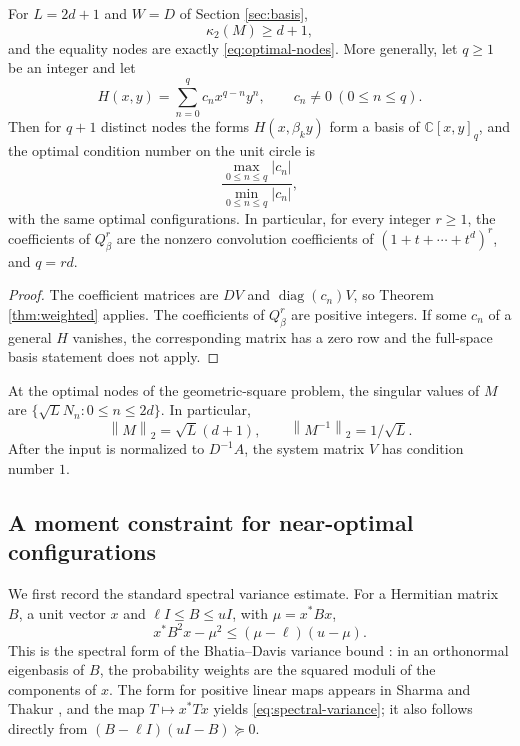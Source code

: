 \documentclass[10pt,twoside,final]{siamart1116}
\numberwithin{equation}{section}
\numberwithin{theorem}{section}
\newcommand{\C}{\mathbb C}
\newcommand{\diag}{\operatorname{diag}}
\newcommand{\norm}[1]{\left\lVert#1\right\rVert_2}
\newcommand{\cond}{\kappa_2}
\begin{document}
\begin{corollary}\label{thm:optimal}
For $L=2d+1$ and $W=D$ of Section \ref{sec:basis},
\begin{equation}\label{eq:opt}
\cond(M)\ge d+1,
\end{equation}
and the equality nodes are exactly \eqref{eq:optimal-nodes}. More generally, let $q\ge1$
be an integer and let
\[
H(x,y)=\sum_{n=0}^{q}c_nx^{q-n}y^n,\qquad c_n\ne0\ (0\le n\le q).
\]
Then for $q+1$ distinct nodes the forms $H(x,\beta_ky)$ form a basis of
$\C[x,y]_q$, and the optimal condition number on the unit circle is
\[
\frac{\max_{0\le n\le q}|c_n|}{\min_{0\le n\le q}|c_n|},
\]
with the same optimal configurations. In particular, for every integer $r\ge1$, the
coefficients of $Q_\beta^r$ are the nonzero convolution coefficients of
$(1+t+\cdots+t^d)^r$, and $q=rd$.
\end{corollary}
\begin{proof}
The coefficient matrices are $DV$ and $\diag(c_n)V$, so Theorem \ref{thm:weighted}
applies. The coefficients of $Q_\beta^r$ are positive integers. If some $c_n$ of a
general $H$ vanishes, the corresponding matrix has a zero row and the full-space basis
statement does not apply.
\end{proof}

\begin{corollary}\label{cor:singular}
At the optimal nodes of the geometric-square problem, the singular values of $M$ are
$\{\sqrt L N_n:0\le n\le2d\}$. In particular,
\[
\norm M=\sqrt L(d+1),\qquad \norm{M^{-1}}=1/\sqrt L.
\]
After the input is normalized to $D^{-1}A$, the system matrix $V$ has condition
number $1$.
\end{corollary}

\subsection{A moment constraint for near-optimal configurations}

We first record the standard spectral variance estimate. For a Hermitian matrix $B$, a
unit vector $x$ and $\ell I\le B\le uI$, with $\mu=x^*Bx$,
\begin{equation}\label{eq:spectral-variance}
x^*B^2x-\mu^2\le(\mu-\ell)(u-\mu).
\end{equation}
This is the spectral form of the Bhatia--Davis variance bound \cite{bhatia}: in an
orthonormal eigenbasis of $B$, the probability weights are the squared moduli of the
components of $x$. The form for positive linear maps appears in Sharma and Thakur
\cite[eq.~(1.2)]{sharma}, and the map $T\mapsto x^*Tx$ yields
\eqref{eq:spectral-variance}; it also follows directly from
$(B-\ell I)(uI-B)\succeq0$.
\end{document}
